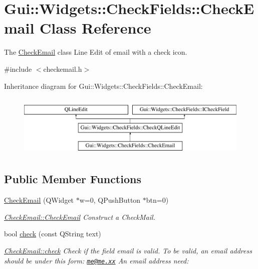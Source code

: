\hypertarget{classGui_1_1Widgets_1_1CheckFields_1_1CheckEmail}{\section{Gui\-:\-:Widgets\-:\-:Check\-Fields\-:\-:Check\-Email Class Reference}
\label{classGui_1_1Widgets_1_1CheckFields_1_1CheckEmail}
}


The \hyperlink{classGui_1_1Widgets_1_1CheckFields_1_1CheckEmail}{Check\-Email} class Line Edit of email with a check icon.  




{\ttfamily \#include $<$checkemail.\-h$>$}

Inheritance diagram for Gui\-:\-:Widgets\-:\-:Check\-Fields\-:\-:Check\-Email\-:\begin{figure}[H]
\begin{center}
\leavevmode
\includegraphics[height=3.000000cm]{d1/d07/classGui_1_1Widgets_1_1CheckFields_1_1CheckEmail}
\end{center}
\end{figure}
\subsection*{Public Member Functions}
\begin{DoxyCompactItemize}
\item 
\hyperlink{classGui_1_1Widgets_1_1CheckFields_1_1CheckEmail_a51694aa43bf0adb2246d0dd9b1d19c0c}{Check\-Email} (Q\-Widget $\ast$w=0, Q\-Push\-Button $\ast$btn=0)
\begin{DoxyCompactList}\small\item\em \hyperlink{classGui_1_1Widgets_1_1CheckFields_1_1CheckEmail_a51694aa43bf0adb2246d0dd9b1d19c0c}{Check\-Email\-::\-Check\-Email} Construct a Check\-Mail. \end{DoxyCompactList}\item 
bool \hyperlink{classGui_1_1Widgets_1_1CheckFields_1_1CheckEmail_a166b7e7d39ca307a52477b2d9ef65ef1}{check} (const Q\-String text)
\begin{DoxyCompactList}\small\item\em \hyperlink{classGui_1_1Widgets_1_1CheckFields_1_1CheckEmail_a166b7e7d39ca307a52477b2d9ef65ef1}{Check\-Email\-::check} Check if the field email is valid. To be valid, an email address should be under this form\-: \href{mailto:me@me.xx}{\tt me@me.\-xx} An email address need\-: \end{DoxyCompactList}\end{DoxyCompactItemize}
